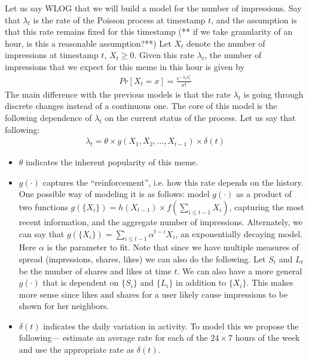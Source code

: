 \documentclass[20pt]{article}
\begin{document}
Let us say WLOG that we will build a model for the number of impressions. 
Say that $\lambda_t$ is the rate of the Poisson process at timestamp $t$, and the assumption is that this rate remains fixed for this 
timestamp (** if we take granularity of an hour, is this a reasonable assumption?**) Let $X_t$ denote the number of impressions at timestamp $t$,
$X_t \ge 0$. 
Given this rate $\lambda_t$, the number of impressions that we expect for this meme in this hour is given by
\begin{align*}
 Pr[X_t = x] = \frac{e^{-\lambda_t \lambda_t^x}}{x!}
\end{align*}
The main difference with the previous models is that the rate $\lambda_t$ is going through discrete changes instead of a continuous one. 
The core of this model is the following dependence of $\lambda_t$ on the current status of the process. Let us say that following:
\begin{align*}
 \lambda_t = \theta \times g(X_1, X_2, \ldots, X_{t-1}) \times \delta(t)
\end{align*}
\begin{itemize}
 \item $\theta$ indicates the inherent popularity of this meme. 
 \item $g(\cdot)$ captures the ``reinforcement'', i.e. how this rate depends on the history. One possible way of modeling it is as follows: model 
 $g(\cdot)$ as a product of two functions $g(\{X_i\}) = h(X_{t-1}) \times f(\sum_{i \le t-1} X_i)$, capturing the most recent information, and the 
 aggregate number of impressions. 
 Alternately, we can say that $g(\{X_i\}) = \sum_{i\le t-1} \alpha^{t-i} X_i$, an exponentially decaying model. Here $\alpha$ is the parameter to fit.  
 Note that since we have multiple measures of spread (impressions, shares, likes) we can also do the following. Let $S_t$ and $L_t$ be the number of shares
 and likes at time $t$. We can also have a more general $g(\cdot)$ that is dependent on $\{S_i\}$ and $\{L_i\}$ in addition to $\{X_i\}$. This makes
 more sense since likes and shares for a user likely cause impressions to be shown for her neighbors. 

 
 \item $\delta(t)$ indicates the daily variation in activity. To model this we propose the following--- estimate an average rate for each
 of the $24\times 7$ hours of the week and use the appropriate rate as $\delta(t)$.    

\end{itemize}
\end{document}
